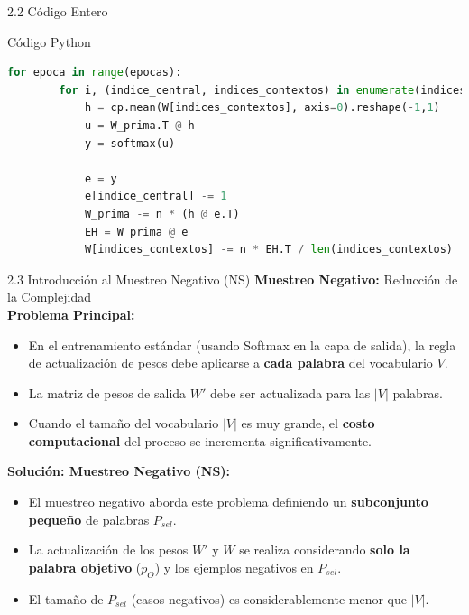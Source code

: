 \documentclass{beamer}
\begin{document}
	
\begin{frame}[fragile]{2.2 Código Entero}
	\begin{block}{Código Python}
		\begin{lstlisting}[language=Python]
for epoca in range(epocas):	
		for i, (indice_central, indices_contextos) in enumerate(indices_tuplas):
			h = cp.mean(W[indices_contextos], axis=0).reshape(-1,1)
			u = W_prima.T @ h
			y = softmax(u)
			
			e = y
			e[indice_central] -= 1
			W_prima -= n * (h @ e.T)
			EH = W_prima @ e
			W[indices_contextos] -= n * EH.T / len(indices_contextos)
		\end{lstlisting}
	\end{block}
\end{frame}
	
\begin{frame}{2.3 Introducción al Muestreo Negativo (NS)}
	\textbf{Muestreo Negativo: } Reducción de la Complejidad\\
	\textbf{Problema Principal:}\\
	\begin{itemize}
		\item En el entrenamiento estándar (usando Softmax en la capa de salida), la regla de actualización de pesos debe aplicarse a \textbf{cada palabra} del vocabulario $V$.
		\item La matriz de pesos de salida $W'$ debe ser actualizada para las $|V|$ palabras.
		\item Cuando el tamaño del vocabulario $|V|$ es muy grande, el \textbf{costo computacional} del proceso se incrementa significativamente.
	\end{itemize}
	
	\textbf{Solución: Muestreo Negativo (NS):}\\
	
	\begin{itemize}
		\item El muestreo negativo aborda este problema definiendo un \textbf{subconjunto pequeño} de palabras $P_{sel}$.
		\item La actualización de los pesos $W'$ y $W$ se realiza considerando \textbf{solo la palabra objetivo} ($p_O$) y los ejemplos negativos en $P_{sel}$.
		\item El tamaño de $P_{sel}$ (casos negativos) es considerablemente menor que $|V|$.

	\end{itemize}
	
\end{frame}	
	
\end{document}
